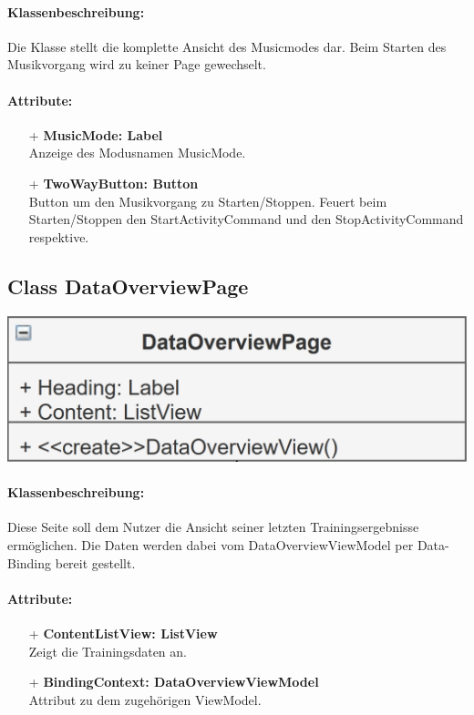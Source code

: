 \documentclass[a4paper,12pt]{article}
\begin{document}
\paragraph{Klassenbeschreibung:}
Die Klasse stellt die komplette Ansicht des Musicmodes dar. Beim Starten des Musikvorgang wird zu keiner Page gewechselt.
\paragraph{Attribute:}
	\begin{itemize}
	\item[+] \textbf{MusicMode: Label} \\ Anzeige des Modusnamen MusicMode.
	\item[+] \textbf{TwoWayButton: Button} \\ Button um den Musikvorgang zu Starten/Stoppen. Feuert beim Starten/Stoppen den StartActivityCommand und den StopActivityCommand respektive.
	\end{itemize}

	\begin{minipage}[t]{0.7\textwidth}	
		\subsection{Class DataOverviewPage}
	\end{minipage}
	\begin{minipage}[c]{0.4\textwidth}
		\includegraphics[width=\textwidth]{bilder/ViewKlassen/DataOverviewPage}
	\end{minipage}
		\paragraph{Klassenbeschreibung:}
		Diese Seite soll dem Nutzer die Ansicht seiner letzten Trainingsergebnisse ermöglichen.
		Die Daten werden dabei vom DataOverviewViewModel per Data-Binding bereit gestellt.
		\paragraph{Attribute:}
		\begin{itemize}
			\item[+] \textbf{ContentListView: ListView}\\Zeigt die Trainingsdaten an. 
			\item[+] \textbf{BindingContext: DataOverviewViewModel}\\Attribut zu dem zugehörigen ViewModel.
		\end{itemize}
\end{document}
